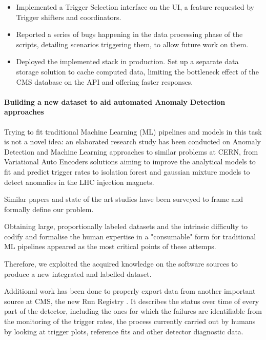 \documentclass[a4, oneside, 11pt, nobib]{memoir}
\begin{document}
\begin{itemize}
		\item Implemented a Trigger Selection interface on the UI, a feature requested by Trigger shifters and coordinators.
		\item Reported a series of bugs happening in the data processing phase of the scripts, detailing scenarios triggering them, to allow future work on them.
		\item Deployed the implemented stack in production. Set up a separate data storage solution to cache computed data, limiting the bottleneck effect of the CMS database on the API and offering faster responses.

		\end{itemize}


		\paragraph{Building a new dataset to aid automated Anomaly Detection approaches}

		Trying to fit traditional Machine Learning (ML) pipelines and models in this task is not a novel idea: an elaborated research study has been conducted on Anomaly Detection and Machine Learning approaches to similar problems at CERN, from Variational Auto Encoders solutions \cite{adpol-cvae} aiming to improve the analytical models to fit and predict trigger rates to isolation forest and gaussian mixture models \cite{Halilovic:2665985} to detect anomalies in the LHC injection magnets.

		Similar papers and state of the art studies have been surveyed to frame and formally define our problem.

		Obtaining large, proportionally labeled datasets and the intrinsic difficulty to codify and formalise the human expertise in a "consumable" form for traditional ML pipelines appeared as the most critical points of these attemps.

		Therefore, we exploited the acquired knowledge on the software sources to produce a new integrated and labelled dataset.

		Additional work has been done to properly export data from another important source at CMS, the new Run Registry \cite{cms_collaboration_2019_3599323}. It describes the status over time of every part of the detector, including the ones for which the failures are identifiable from the monitoring of the trigger rates, the process currently carried out by humans by looking at trigger plots, reference fits and other detector diagnostic data.
\end{document}
